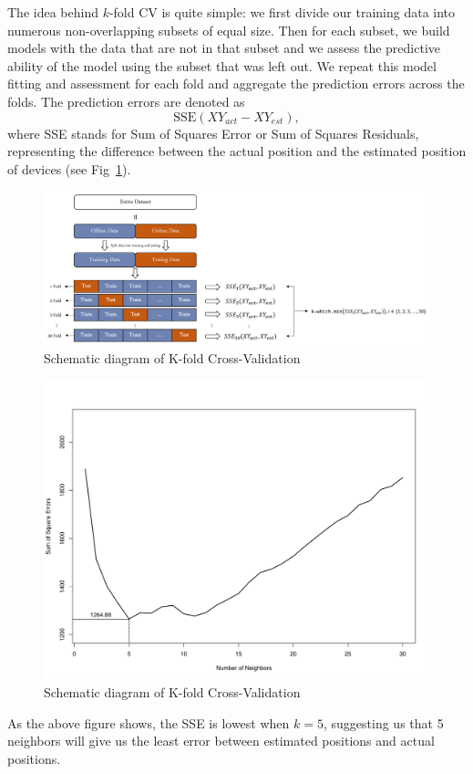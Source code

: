 \documentclass[12pt, conference]{IEEEtran}
\begin{document}
The idea behind $k$-fold CV is quite simple: we first divide our training data into numerous non-overlapping subsets of equal size. Then for each subset, we build models with the data that are not in that subset and we assess the predictive ability of the model using the subset that was left out. We repeat this model fitting and assessment for each fold and aggregate the prediction errors across the folds. The prediction errors are denoted as 
$$
  \text{SSE}(XY_{act}-XY_{est}),
$$ 
where SSE stands for Sum of Squares Error or Sum of Squares Residuals, representing the difference between the actual position and the estimated position of devices (see Fig~\ref{fig: K-Fold CV}).
\begin{figure}[htbp]
  \centerline{\includegraphics[width=\columnwidth]{img/K-Fold CV.png}}
  \caption{Schematic diagram of K-fold Cross-Validation}
  \label{fig: K-Fold CV}
\end{figure}

\begin{figure}[htbp]
  \centerline{\includegraphics[width=\columnwidth]{img/Plot-k-fold_CV-1.png}}
  \caption{Schematic diagram of K-fold Cross-Validation}
  \label{fig: Choice of K}
\end{figure}
As the above figure shows, the SSE is lowest when $k=5$, suggesting us that 5 neighbors will give us the least error between estimated positions and actual positions.
\end{document}

